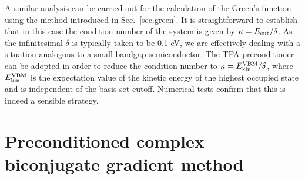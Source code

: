 \documentclass[twocolumn,prb,showpacs,superscriptaddress]{revtex4}
\begin{document}
A similar analysis can be carried out for the calculation of the Green's
function using the method introduced in Sec.\ \ref{sec.green}.
It is straightforward to establish that in this case the condition number
of the system is given by $\kappa = E_{\rm cut}/\delta$.
As the infinitesimal $\delta$ is typically taken to be 0.1 eV, we are effectively
dealing with a situation analogous to a small-bandgap semiconductor.
The TPA preconditioner can be adopted in order to reduce the condition number
to $\kappa = E_{\rm kin}^{\rm VBM}/\delta$, where $E_{\rm kin}^{\rm VBM}$
is the expectation value of the kinetic energy of the highest occupied state
and is independent of the basis set cutoff. Numerical tests confirm that this 
is indeed a sensible strategy.

\section{Preconditioned complex biconjugate gradient method}\label{app.cbcg}
\end{document}
